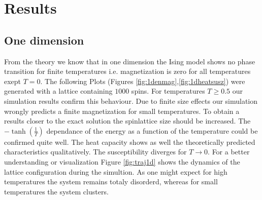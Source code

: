 \documentclass[12pt,a4paper,titlepage]{article}
\begin{document}
\section{Results}


\subsection{One dimension}

From the theory we know that in one dimension the Ising model shows no phase transition for finite temperatures i.e. magnetization is zero for all temperatures exept $T=0$. The following Plots (Figures \ref{fig:1denmag},\ref{fig:1dheatsusz}) were generated with a lattice containing $1000$ spins. For temperatures $T\geq 0.5$ our simulation results confirm this behaviour. Due to finite size effects our simulation wrongly predicts a finite magnetization for small temperatures. To obtain a results closer to the exact solution the spinlattice size should be increased. The $-\tanh(\frac{1}{T})$ dependance of the energy as a function of the temperature could be confirmed quite well. The heat capacity shows as well the theoretically predicted characteristics qualitatively. The susceptibility diverges for $T\rightarrow0$. For a better understanding or visualization Figure \ref{fig:traj1d} shows the dynamics of the lattice configuration during the simultion. As one might expect for high temperatures the system remains totaly disorderd, whereas for small temperatures the system clusters.
\end{document}
